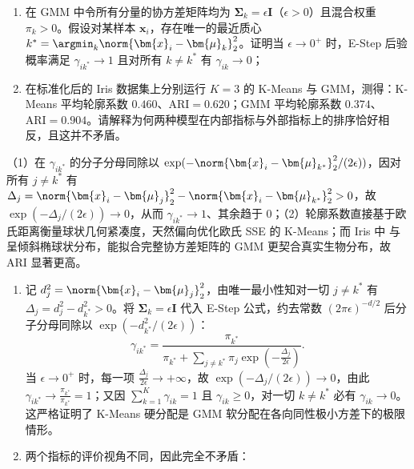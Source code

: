\begin{exercise}[title={K-Means 与 GMM 的极限联系及 Iris 实验剖析},level=advanced,points=18,tags={K-Means,GMM,EM算法,轮廓系数,ARI}]
\begin{enumerate}
  \item 在 GMM 中令所有分量的协方差矩阵均为 $\bm{\Sigma}_k = \epsilon\bm{I}$（$\epsilon > 0$）且混合权重 $\pi_k > 0$。假设对某样本 $\bm{x}_i$，存在唯一的最近质心 $k^* = \argmin_k \norm{\bm{x}_i - \bm{\mu}_k}_2^2$。证明当 $\epsilon \to 0^+$ 时，E-Step 后验概率满足 $\gamma_{ik^*} \to 1$ 且对所有 $k \ne k^*$ 有 $\gamma_{ik} \to 0$；
  \item 在标准化后的 Iris 数据集上分别运行 $K=3$ 的 K-Means 与 GMM，测得：K-Means 平均轮廓系数 $0.460$、$\mathrm{ARI} = 0.620$；GMM 平均轮廓系数 $0.374$、$\mathrm{ARI} = 0.904$。请解释为何两种模型在内部指标与外部指标上的排序恰好相反，且这并不矛盾。
\end{enumerate}
\begin{answer}
（1）在 $\gamma_{ik^*}$ 的分子分母同除以 $\exp(-\norm{\bm{x}_i-\bm{\mu}_{k^*}}_2^2/(2\epsilon))$，因对所有 $j\ne k^*$ 有 $\Delta_j = \norm{\bm{x}_i-\bm{\mu}_j}_2^2 - \norm{\bm{x}_i-\bm{\mu}_{k^*}}_2^2 > 0$，故 $\exp(-\Delta_j/(2\epsilon))\to 0$，从而 $\gamma_{ik^*}\to 1$、其余趋于 $0$；（2）轮廓系数直接基于欧氏距离衡量球状几何紧凑度，天然偏向优化欧氏 SSE 的 K-Means；而 Iris 中  与  呈倾斜椭球状分布，能拟合完整协方差矩阵的 GMM 更契合真实生物分布，故 ARI 显著更高。
\end{answer}
\begin{solution}
\begin{enumerate}
  \item 记 $d_j^2 = \norm{\bm{x}_i - \bm{\mu}_j}_2^2$，由唯一最小性知对一切 $j\ne k^*$ 有 $\Delta_j = d_j^2 - d_{k^*}^2 > 0$。将 $\bm{\Sigma}_k = \epsilon\bm{I}$ 代入 E-Step 公式，约去常数 $(2\pi\epsilon)^{-d/2}$ 后分子分母同除以 $\exp(-d_{k^*}^2 / (2\epsilon))$：
  \[
    \gamma_{ik^*}
    = \frac{\pi_{k^*}}{\pi_{k^*} + \sum_{j\ne k^*} \pi_j \exp\!\left(-\frac{\Delta_j}{2\epsilon}\right)}.
  \]
  当 $\epsilon \to 0^+$ 时，每一项 $\frac{\Delta_j}{2\epsilon} \to +\infty$，故 $\exp(-\Delta_j / (2\epsilon)) \to 0$，由此 $\gamma_{ik^*} \to \frac{\pi_{k^*}}{\pi_{k^*}} = 1$；又因 $\sum_{k=1}^{K}\gamma_{ik} = 1$ 且 $\gamma_{ik}\ge 0$，对一切 $k\ne k^*$ 必有 $\gamma_{ik}\to 0$。这严格证明了 K-Means 硬分配是 GMM 软分配在各向同性极小方差下的极限情形。
  \item 两个指标的评价视角不同，因此完全不矛盾：
  \begin{itemize}

\end{itemize}
\end{enumerate}
\end{solution}
\end{exercise}
